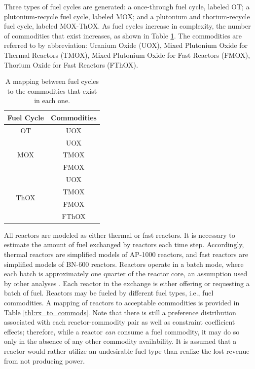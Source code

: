 \documentclass{anstrans}
\begin{document}
Three types of fuel cycles are generated: a once-through fuel cycle, labeled
OT; a plutonium-recycle fuel cycle, labeled MOX; and a plutonium and
thorium-recycle fuel cycle, labeled MOX-ThOX. As fuel cycles increase in
complexity, the number of commodities that exist increases, as shown in Table
\ref{tbl:fc_to_commods}. The commodities are referred to by abbreviation:
Uranium Oxide (UOX), Mixed Plutonium Oxide for Thermal Reactors (TMOX), Mixed
Plutonium Oxide for Fast Reactors (FMOX), Thorium Oxide for Fast Reactors
(FThOX).

\begin{table}[]
\centering
\caption{A mapping between fuel cycles to the commodities that exist in each
  one.}
\label{tbl:fc_to_commods}
\begin{tabular}{|c|c|}
\hline
\textbf{Fuel Cycle}            & \textbf{Commodities} \\ \hline
OT                    & UOX         \\ \hline
\multirow{3}{*}{MOX}  & UOX         \\  
                      & TMOX        \\  
                      & FMOX        \\ \hline
\multirow{4}{*}{ThOX} & UOX         \\  
                      & TMOX        \\  
                      & FMOX        \\  
                      & FThOX       \\ \hline
\end{tabular}
\end{table}

All reactors are modeled as either thermal or fast reactors. It is necessary to
estimate the amount of fuel exchanged by reactors each time step. Accordingly,
thermal reactors are simplified models of AP-1000 reactors, and fast reactors
are simplified models of BN-600 reactors. Reactors operate in a batch mode,
where each batch is approximately one quarter of the reactor core, an assumption
used by other analyses \cite{rineiski2011reactivity}. Each reactor in the
exchange is either offering or requesting a batch of fuel. Reactors may be
fueled by different fuel types, i.e., fuel commodities. A mapping of reactors to
acceptable commodities is provided in Table \ref{tbl:rx_to_commods}. Note that
there is still a preference distribution associated with each reactor-commodity
pair as well as constraint coefficient effects; therefore, while a reactor
\textit{can} consume a fuel commodity, it may do so only in the absence of any
other commodity availability. It is assumed that a reactor would rather utilize
an undesirable fuel type than realize the lost revenue from not producing power.
\end{document}
